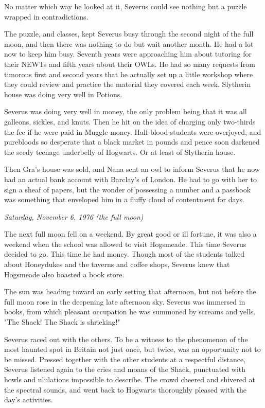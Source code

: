 \documentclass[a4paper,11pt]{article}
\begin{document}
No matter which way he looked at it, Severus could see nothing but a puzzle wrapped in contradictions.

The puzzle, and classes, kept Severus busy through the second night of the full moon, and then there was nothing to do but wait another month. He had a lot now to keep him busy. Seventh years were approaching him about tutoring for their NEWTs and fifth years about their OWLs. He had so many requests from timorous first and second years that he actually set up a little workshop where they could review and practice the material they covered each week. Slytherin house was doing very well in Potions.

Severus was doing very well in money, the only problem being that it was all galleons, sickles, and knuts. Then he hit on the idea of charging only two-thirds the fee if he were paid in Muggle money. Half-blood students were overjoyed, and purebloods so desperate that a black market in pounds and pence soon darkened the seedy teenage underbelly of Hogwarts. Or at least of Slytherin house.

Then Gra's house was sold, and Nana sent an owl to inform Severus that he now had an actual bank account with Barclay's of London. He had to go with her to sign a sheaf of papers, but the wonder of possessing a number and a passbook was something that enveloped him in a fluffy cloud of contentment for days.

\emph{Saturday, November 6, 1976 (the full moon)}

The next full moon fell on a weekend. By great good or ill fortune, it was also a weekend when the school was allowed to visit Hogsmeade. This time Severus decided to go. This time he had money. Though most of the students talked about Honeydukes and the taverns and coffee shops, Severus knew that Hogsmeade also boasted a book store.

The sun was heading toward an early setting that afternoon, but not before the full moon rose in the deepening late afternoon sky. Severus was immersed in books, from which pleasant occupation he was summoned by screams and yells. "The Shack! The Shack is shrieking!"

Severus raced out with the others. To be a witness to the phenomenon of the most haunted spot in Britain not just once, but twice, was an opportunity not to be missed. Pressed together with the other students at a respectful distance, Severus listened again to the cries and moans of the Shack, punctuated with howls and ululations impossible to describe. The crowd cheered and shivered at the spectral sounds, and went back to Hogwarts thoroughly pleased with the day's activities.
\end{document}
